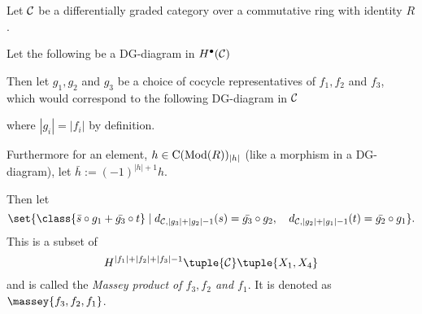 \begin{definition}
    \label{def:massey_product_dg_cat}
    Let \( {\mathcal{C}} \) be a differentially graded category over a commutative ring with identity \( R \).

    Let the following be a DG-diagram in \( H^\bullet({\mathcal{C}}) \)
    \begin{center}
    \end{center}

    Then let \( g_1, g_2 \) and \( g_3 \) be a choice of cocycle representatives of \( f_1, f_2 \) and \( f_3 \), which would correspond to the following DG-diagram in \( {\mathcal{C}} \)
    \begin{center}
    \end{center}
    where \( |g_i| = |f_i| \) by definition.

    Furthermore for an element, \( h \in \operatorname{C}(\operatorname{Mod}(R))_{|h|} \) (like a morphism in a DG-diagram), let \( \bar{h} := (-1)^{|h| + 1}h \).

    Then let
    \[
        \set{
            \class{
                \bar{s} \circ g_1 + \bar{g_3} \circ t
            }
            \mid
            d_{\Cc, |g_3| + |g_2| - 1}(s) = \bar{g_3} \circ g_2, \quad
            d_{\Cc, |g_2| + |g_1| - 1}(t) = \bar{g_2} \circ g_1
        }.
    \]
    This is a subset of
    \[
        H^{|f_1| + |f_2| + |f_3| - 1}\tuple{\Cc}\tuple{X_1, X_4}
    \]
    and is called the \emph{Massey product of \( f_3, f_2 \) and \( f_1 \)}. It is denoted as \( \massey{f_3, f_2, f_1 } \).
\end{definition}

